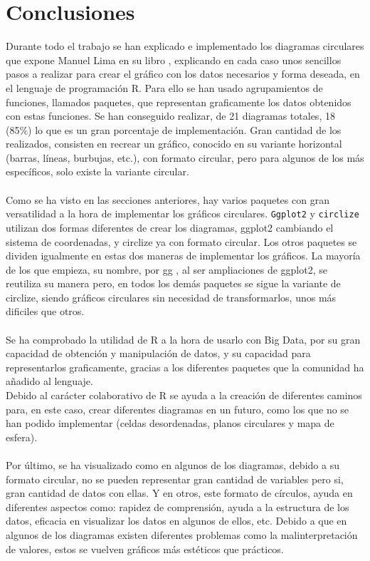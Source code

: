 \documentclass{article}\usepackage[]{graphicx}\usepackage[]{color}
\begin{document}
\section{Conclusiones}
Durante todo el trabajo se han explicado e implementado los diagramas circulares que expone Manuel Lima en su libro \cite{Circle}
, explicando en cada caso unos sencillos pasos a realizar para crear el gr\'afico con los datos necesarios y forma deseada, en el lenguaje de programaci\'on R. Para ello se han usado agrupamientos de funciones, llamados paquetes, que representan graficamente los datos obtenidos con estas funciones.
Se han conseguido realizar, de 21 diagramas totales, 18 (85\%) lo que es un gran porcentaje de implementaci\'on. Gran cantidad de los realizados, consisten en recrear un gr\'afico, conocido en su variante horizontal (barras, l\'ineas, burbujas, etc.), con formato circular, pero para algunos de los m\'as espec\'ificos, solo existe la variante circular. ~\\~\\
Como se ha visto en las secciones anteriores, hay varios paquetes con gran versatilidad a la hora de implementar los gr\'aficos circulares. \texttt{Ggplot2} y \texttt{circlize} utilizan dos formas diferentes de crear los diagramas, ggplot2 cambiando el sistema de coordenadas, y circlize ya con formato circular. Los otros paquetes se dividen igualmente en estas dos maneras de implementar los gr\'aficos. La mayor\'ia de los que empieza, su nombre, por gg , al ser ampliaciones de ggplot2, se reutiliza su manera pero, en todos los dem\'as paquetes se sigue la variante de circlize, siendo gr\'aficos circulares sin necesidad de transformarlos, unos m\'as dificiles que otros.~\\~\\
Se ha comprobado la utilidad de R a la hora de usarlo con Big Data, por su gran capacidad de obtenci\'on y manipulaci\'on de datos, y su capacidad para representarlos graficamente, gracias a los diferentes paquetes que la comunidad ha a\~nadido al lenguaje.~\\ Debido al car\'acter colaborativo de R se ayuda a la creaci\'on de diferentes caminos para, en este caso, crear diferentes diagramas en un futuro, como los que no se han podido implementar (celdas desordenadas, planos circulares y mapa de esfera).~\\~\\
Por \'ultimo, se ha visualizado como en algunos de los diagramas, debido a su formato circular, no se pueden representar gran cantidad de variables pero si, gran cantidad de datos con ellas. Y en otros, este formato de c\'irculos, ayuda en diferentes aspectos como: rapidez de comprensi\'on, ayuda a la estructura de los datos, eficacia en visualizar los datos en algunos de ellos, etc. Debido a que en algunos de los diagramas existen diferentes problemas como la malinterpretaci\'on de valores, estos se vuelven gr\'aficos m\'as est\'eticos que pr\'acticos.
\clearpage
{}


\end{document}
